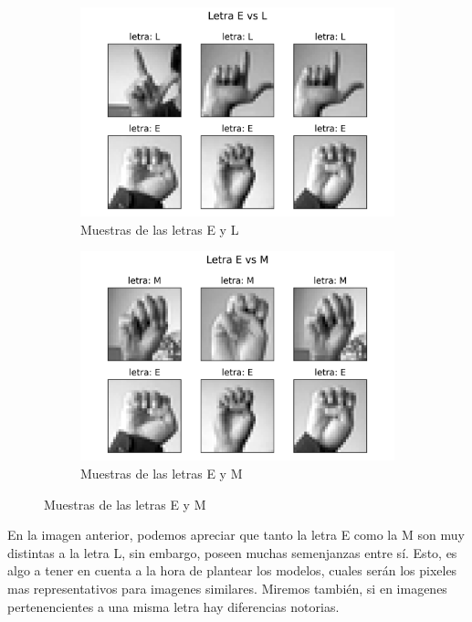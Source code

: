 \documentclass[10pt,a4paper]{article}
\begin{document}
\begin{figure}[ht!]
	\begin{subfigure}{0.5\textwidth}
		\includegraphics[width=0.9\linewidth]{Imagenes/letra_E_vs_L.png} 
		\caption{Muestras de las letras E y L}
		\label{fig:subfig1}
	\end{subfigure}
	\begin{subfigure}{0.5\textwidth}
		\includegraphics[width=0.9\linewidth]{Imagenes/letra_E_vs_M.png}
		\caption{Muestras de las letras E y M}
		\label{fig:subfig2}
	\end{subfigure}
	\label{fig:subfigs}
\end{figure}

En la imagen anterior, podemos apreciar que tanto la letra E como la M son muy distintas a la letra L, sin embargo, poseen muchas semenjanzas entre sí. Esto, es algo a tener en cuenta a la hora de plantear los modelos, cuales serán los pixeles mas representativos para imagenes similares.
Miremos también, si en imagenes pertenencientes a una misma letra hay diferencias notorias. 
\end{document}
